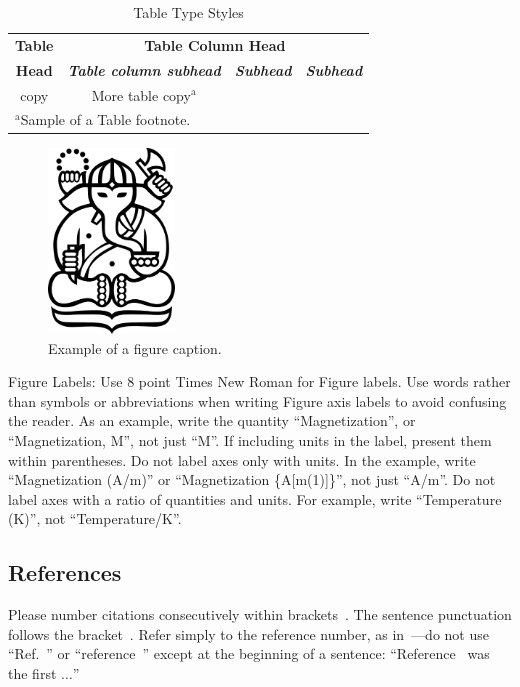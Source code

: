 \begin{table}[htbp]
	\caption{Table Type Styles}\label{tab1}
	\begin{center}
		\begin{tabular}{c c c c}
			\toprule
			\textbf{Table} & \multicolumn{3}{|c|}{\textbf{Table Column Head}}                                                         \\
			\cline{2-4}
			\textbf{Head}  & \textbf{\textit{Table column subhead}}           & \textbf{\textit{Subhead}} & \textbf{\textit{Subhead}} \\
			\midrule
			copy           & More table copy$^{\mathrm{a}}$                   &                           &                           \\
			\bottomrule
			\multicolumn{4}{l}{$^{\mathrm{a}}$Sample of a Table footnote.}
		\end{tabular}
	\end{center}
\end{table}

\begin{figure}[htbp]
	\centerline{\includegraphics[width=0.3\textwidth]{resources/cover-ganesha.jpg}}
	\caption{Example of a figure caption.}\label{fig}
\end{figure}

Figure Labels: Use 8 point Times New Roman for Figure labels. Use words
rather than symbols or abbreviations when writing Figure axis labels to
avoid confusing the reader. As an example, write the quantity
``Magnetization'', or ``Magnetization, M'', not just ``M''. If including
units in the label, present them within parentheses. Do not label axes only
with units. In the example, write ``Magnetization (A/m)'' or ``Magnetization
\{A[m\@(1)]\}'', not just ``A/m''. Do not label axes with a ratio of
quantities and units. For example, write ``Temperature (K)'', not
``Temperature/K''.

\subsection{References}
Please number citations consecutively within brackets\ \cite{b1}. The
sentence punctuation follows the bracket\ \cite{b2}. Refer simply to the reference
number, as in\ \cite{b3}---do not use ``Ref.\ \cite{b3}'' or ``reference\ \cite{b3}'' except at
the beginning of a sentence: ``Reference\ \cite{b3} was the first $\ldots$''

